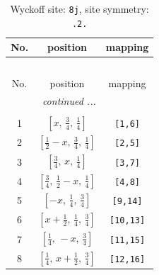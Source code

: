 \documentclass[fleqn,8pt]{jsarticle}
\begin{document}
\begin{longtable}{ccc}
\caption{Wyckoff site: {\tt 8j}, site symmetry: {\tt .2.}}
 \\
 \hline \hline
No. & position & mapping \\ \hline \endfirsthead

\multicolumn{2}{l}{\tablename\ \thetable{}} \\
 \hline \hline
No. & position & mapping \\ \hline \endhead

 \hline \hline
\multicolumn{2}{r}{\footnotesize\it continued ...} \\ \endfoot

 \hline \hline
\multicolumn{2}{r}{} \\ \endlastfoot

1 & $\left[ x,\, \frac{3}{4},\, \frac{1}{4} \right]$ & {\tt [1,6]} \\ \hline
2 & $\left[ \frac{1}{2} - x,\, \frac{3}{4},\, \frac{1}{4} \right]$ & {\tt [2,5]} \\ \hline
3 & $\left[ \frac{3}{4},\, x,\, \frac{1}{4} \right]$ & {\tt [3,7]} \\ \hline
4 & $\left[ \frac{3}{4},\, \frac{1}{2} - x,\, \frac{1}{4} \right]$ & {\tt [4,8]} \\ \hline
5 & $\left[ - x,\, \frac{1}{4},\, \frac{3}{4} \right]$ & {\tt [9,14]} \\ \hline
6 & $\left[ x + \frac{1}{2},\, \frac{1}{4},\, \frac{3}{4} \right]$ & {\tt [10,13]} \\ \hline
7 & $\left[ \frac{1}{4},\, - x,\, \frac{3}{4} \right]$ & {\tt [11,15]} \\ \hline
8 & $\left[ \frac{1}{4},\, x + \frac{1}{2},\, \frac{3}{4} \right]$ & {\tt [12,16]} \\
\end{longtable}
\renewcommand{\arraystretch}{1.2}
\end{document}
